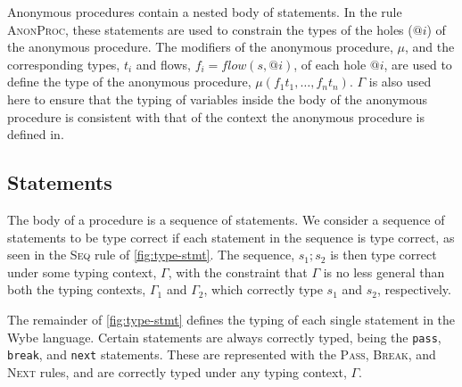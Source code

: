 Anonymous procedures contain a nested body of statements. In the rule \textsc{AnonProc}, these statements are used to constrain the types of the holes ($\mathtt{@}i$) of the anonymous procedure. The modifiers of the anonymous procedure, $\mu$, and the corresponding types, $t_i$ and flows, $f_i = flow(s, \mathtt{@}i)$, of each hole $\mathtt{@}i$, are used to define the type of the anonymous procedure, $\mu(f_1t_1,\dots,f_nt_n)$. $\Gamma$ is also used here to ensure that the typing of variables inside the body of the anonymous procedure is consistent with that of the context the anonymous procedure is defined in.

\subsection{Statements}

The body of a procedure is a sequence of statements. We consider a sequence of statements to be type correct if each statement in the sequence is type correct, as seen in the \textsc{Seq} rule of \cref{fig:type-stmt}. The sequence, $s_1;s_2$ is then type correct under some typing context, $\Gamma$, with the constraint that $\Gamma$ is no less general than both the typing contexts, $\Gamma_1$ and $\Gamma_2$, which correctly type $s_1$ and $s_2$, respectively.

The remainder of \cref{fig:type-stmt} defines the typing of each single statement in the Wybe language. Certain statements are always correctly typed, being the \texttt{pass}, \texttt{break}, and \texttt{next} statements. These are represented with the \textsc{Pass}, \textsc{Break}, and \textsc{Next} rules, and are correctly typed under any typing context, $\Gamma$.

